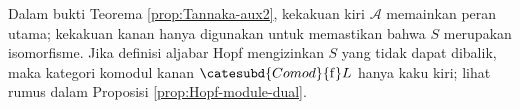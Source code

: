 Dalam bukti Teorema \ref{prop:Tannaka-aux2}, kekakuan kiri $\mathcal{A}$
memainkan peran utama; kekakuan kanan hanya digunakan untuk memastikan bahwa
$S$ merupakan isomorfisme. Jika definisi aljabar Hopf mengizinkan $S$ yang
tidak dapat dibalik, maka kategori komodul kanan
$\catesubd{Comod}{\mathrm{f}}L$ hanya kaku kiri; lihat rumus dalam Proposisi
\ref{prop:Hopf-module-dual}.
